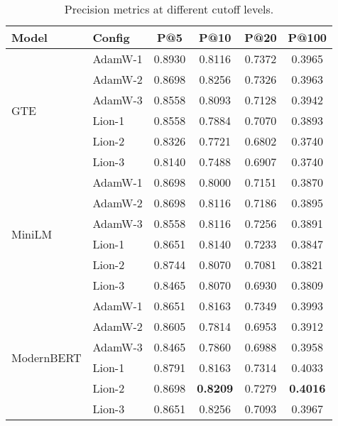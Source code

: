 \begin{table}[htbp]
\centering
\caption{Precision metrics at different cutoff levels.}
\label{tab:precision_metrics}
\small
\begin{tabular}{llcccc}
\toprule
\textbf{Model} & \textbf{Config} & \textbf{P@5} & \textbf{P@10} & \textbf{P@20} & \textbf{P@100} \\
\midrule
\multirow{6}{*}{GTE} & AdamW-1 & 0.8930 & 0.8116 & 0.7372 & 0.3965 \\
 & AdamW-2 & 0.8698 & 0.8256 & 0.7326 & 0.3963 \\
 & AdamW-3 & 0.8558 & 0.8093 & 0.7128 & 0.3942 \\
 & Lion-1 & 0.8558 & 0.7884 & 0.7070 & 0.3893 \\
 & Lion-2 & 0.8326 & 0.7721 & 0.6802 & 0.3740 \\
 & Lion-3 & 0.8140 & 0.7488 & 0.6907 & 0.3740 \\
\midrule
\multirow{6}{*}{MiniLM} & AdamW-1 & 0.8698 & 0.8000 & 0.7151 & 0.3870 \\
 & AdamW-2 & 0.8698 & 0.8116 & 0.7186 & 0.3895 \\
 & AdamW-3 & 0.8558 & 0.8116 & 0.7256 & 0.3891 \\
 & Lion-1 & 0.8651 & 0.8140 & 0.7233 & 0.3847 \\
 & Lion-2 & 0.8744 & 0.8070 & 0.7081 & 0.3821 \\
 & Lion-3 & 0.8465 & 0.8070 & 0.6930 & 0.3809 \\
\midrule
\multirow{6}{*}{ModernBERT} & AdamW-1 & 0.8651 & 0.8163 & 0.7349 & 0.3993 \\
 & AdamW-2 & 0.8605 & 0.7814 & 0.6953 & 0.3912 \\
 & AdamW-3 & 0.8465 & 0.7860 & 0.6988 & 0.3958 \\
 & Lion-1 & 0.8791 & 0.8163 & 0.7314 & 0.4033 \\
 & Lion-2 & 0.8698 & \textbf{0.8209} & 0.7279 & \textbf{0.4016} \\
 & Lion-3 & 0.8651 & 0.8256 & 0.7093 & 0.3967 \\
\bottomrule
\end{tabular}
\end{table}

